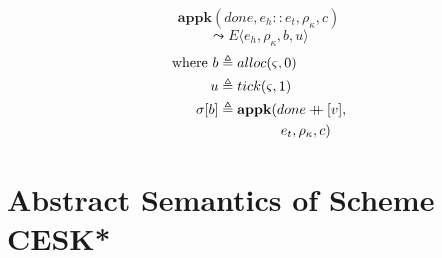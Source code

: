 \documentclass[12pt,draft]{article}
\newcommand\mdoubleplus{\ensuremath{\mathbin{+\mkern-9mu+}}}
\begin{document}
\begin{multicols*}{2}
\[
\textbf{appk}(done, e_h::e_t, \rho_{\kappa}, c)
\]
\vspace{-7mm}
\[
\leadsto
E\langle
e_h , \rho_{\kappa} , b , u
\rangle
\]
\vspace{-10mm}
\begin{align*}
\text{where } b &\triangleq alloc(\varsigma, 0) \\
u &\triangleq tick(\varsigma, 1) \\
\sigma[b] &\triangleq \textbf{appk}(done \mdoubleplus [v], \\
&\;\;\;\;\;\;\;\;\;\;\;\;\;\;\;\; e_t , \rho_{\kappa} , c)
\end{align*}
\end{multicols*}



\newpage
\section{Abstract Semantics of Scheme CESK*}
\end{document}
